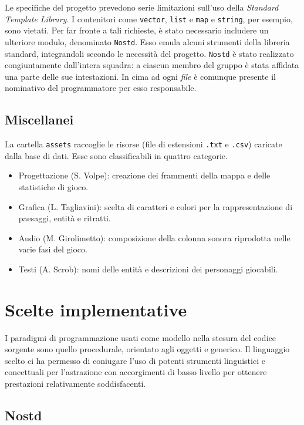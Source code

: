 \documentclass[a4paper]{article}
\begin{document}
Le specifiche del progetto prevedono serie limitazioni sull'uso della
\emph{Standard Template Library}. I contenitori come \verb!vector!, \verb!list!
e \verb!map! e \verb!string!, per esempio, sono vietati. Per far fronte a tali
richieste, \`e stato necessario includere un ulteriore modulo, denominato
\verb!Nostd!. Esso emula alcuni strumenti della libreria standard, integrandoli
secondo le necessit\`a del progetto. \verb!Nostd! \`e stato realizzato
congiuntamente dall'intera squadra: a ciascun membro del gruppo \`e stata
affidata una parte delle sue intestazioni. In cima ad ogni \emph{file} \`e
comunque presente il nominativo del programmatore per esso responsabile.

\subsection{Miscellanei}

La cartella \verb!assets! raccoglie le risorse (file di estensioni \verb!.txt! e
\verb!.csv!) caricate dalla base di dati. Esse sono classificabili in quattro
categorie.

\begin{itemize}
  \item Progettazione (S. Volpe): creazione dei frammenti della mappa e delle
    statistiche di gioco.
  \item Grafica (L. Tagliavini): scelta di caratteri e colori per la
    rappresentazione di paesaggi, entit\`a e ritratti.
  \item Audio (M. Girolimetto): composizione della colonna sonora riprodotta
    nelle varie fasi del gioco.
  \item Testi (A. Scrob): nomi delle entit\`a e descrizioni dei personaggi
    giocabili.
\end{itemize}

\section{Scelte implementative}

I paradigmi di programmazione usati come modello nella stesura del codice
sorgente sono quello procedurale, orientato agli oggetti e generico. Il
linguaggio scelto ci ha permesso di coniugare l'uso di potenti strumenti
linguistici e concettuali per l'astrazione con accorgimenti di basso livello per
ottenere prestazioni relativamente soddisfacenti.

\subsection{Nostd}
\end{document}

